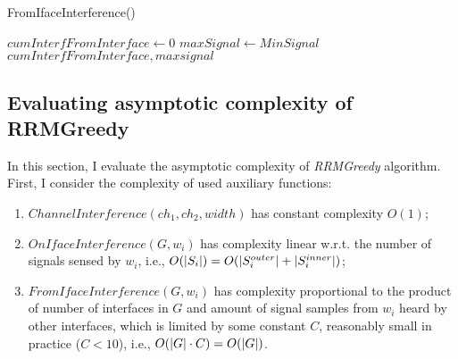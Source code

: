 \begin{algorithm}[hbpt]
\caption{FromIfaceInterference()}
\label{rrm:fromifaceinterf}
\DontPrintSemicolon
{}

$cumInterfFromInterface \gets 0$\;
$maxSignal \gets MinSignal$\;
\Return $cumInterfFromInterface, maxsignal$\;
\end{algorithm}

\subsection{Evaluating asymptotic complexity of RRMGreedy}
\label{chapter:research:sec:rrmgreedy:subsec:complexity}
In this section, I evaluate the asymptotic complexity of \textit{RRMGreedy} algorithm.
First, I consider the complexity of used auxiliary functions:
\begin{enumerate}
    \item $ChannelInterference(ch_1, ch_2, width)$ has constant complexity $O(1)$;
    \item $OnIfaceInterference(G, w_i)$ has complexity linear w.r.t. the number of signals sensed by $w_i$, i.e.,
        $O(\lvert{S_i}\rvert) = O(\lvert{S^{outer}_i}\rvert + \lvert{S^{inner}_i}\rvert)$;
    \item $FromIfaceInterference(G, w_i)$ has complexity proportional to the product of number of interfaces in $G$ and amount of signal samples from $w_i$ heard by other interfaces, which is limited by some constant $C$, reasonably small in practice ($C < 10$), i.e.,
        $O(\lvert{G}\rvert \cdot C) = O(\lvert{G}\rvert)$.
\end{enumerate}

